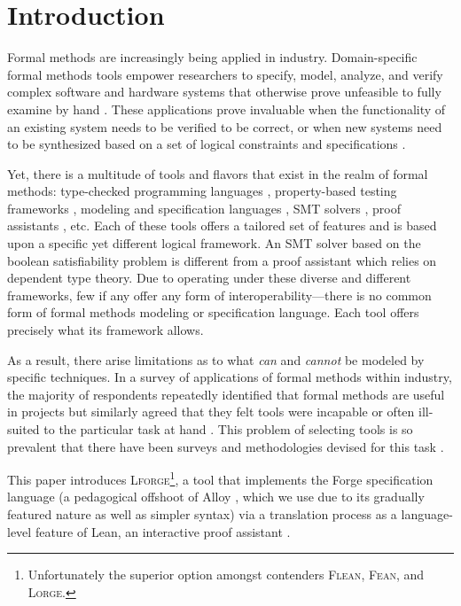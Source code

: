 
\section{Introduction}
Formal methods are increasingly being applied in industry. Domain-specific formal methods tools empower researchers to specify, model, analyze, and verify complex software and hardware systems that otherwise prove unfeasible to fully examine by hand \cite{abrial2006formal,lecomte2017applying}. These applications prove invaluable when the functionality of an existing system needs to be verified to be correct, or when new systems need to be synthesized based on a set of logical constraints and specifications \cite{woodcock2009formal}.

Yet, there is a multitude of tools and flavors that exist in the realm of formal methods: type-checked programming languages \cite{gao2017type,chaudhuri2017fast}, property-based testing frameworks \cite{fink1997property,maciver2019hypothesis}, modeling and specification languages \cite{jackson2012software,jackson2019alloy,ngpdbccdlrrvwwk-oopsla-2024}, SMT solvers \cite{de2008z3}, proof assistants \cite{moura2021lean}, etc. Each of these tools offers a tailored set of features and is based upon a specific yet different logical framework. An SMT solver based on the boolean satisfiability problem is different from a proof assistant which relies on dependent type theory. Due to operating under these diverse and different frameworks, few if any offer any form of interoperability---there is no common form of formal methods modeling or specification language. Each tool offers precisely what its framework allows. 

As a result, there arise limitations as to what \emph{can} and \emph{cannot} be modeled by specific techniques. In a survey of applications of formal methods within industry, the majority of respondents repeatedly identified that formal methods are useful in projects but similarly agreed that they felt tools were incapable or often ill-suited to the particular task at hand \cite{woodcock2009formal}. This problem of selecting tools is so prevalent that there have been surveys and methodologies devised for this task \cite{kossak2016select,cheng2006survey}. 

This paper introduces \textsc{Lforge}\footnote{Unfortunately the superior option amongst contenders \textsc{Flean}, \textsc{Fean}, and \textsc{Lorge}.}, a tool that implements the Forge specification language \cite{ngpdbccdlrrvwwk-oopsla-2024} (a pedagogical offshoot of Alloy \cite{jackson2012software}, which we use due to its gradually featured nature as well as simpler syntax) via a translation process as a language-level feature of Lean, an interactive proof assistant \cite{moura2021lean}.

